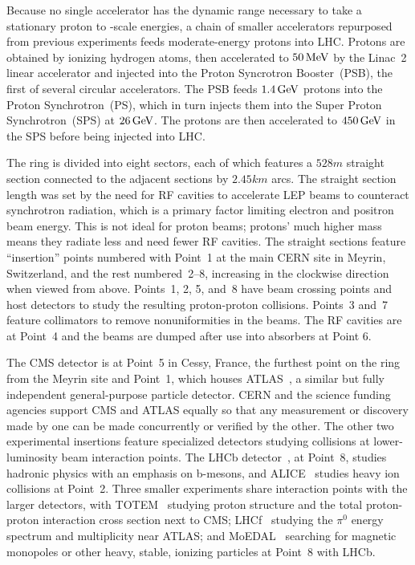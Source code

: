 Because no single accelerator has the dynamic range necessary to take a stationary proton to \TeV-scale energies, a chain of smaller accelerators repurposed from previous experiments feeds moderate-energy protons into LHC\@.
Protons are obtained by ionizing hydrogen atoms, then accelerated to $50\,\mathrm{Me\hspace{-.08em}V}$ by the Linac~2 linear accelerator and injected into the Proton Syncrotron Booster~(PSB), the first of several circular accelerators.
The PSB feeds $1.4\,\mathrm{Ge\hspace{-.08em}V}$ protons into the Proton Synchrotron~(PS), which in turn injects them into the Super Proton Synchrotron~(SPS) at $26\,\mathrm{Ge\hspace{-.08em}V}$.
The protons are then accelerated to $450\,\mathrm{Ge\hspace{-.08em}V}$ in the SPS before being injected into LHC\@.

The ring is divided into eight sectors, each of which features a $528\unit{m}$ straight section connected to the adjacent sections by $2.45\unit{km}$ arcs.
The straight section length was set by the need for RF cavities to accelerate LEP beams to counteract synchrotron radiation, which is a primary factor limiting electron and positron beam energy.
This is not ideal for proton beams; protons' much higher mass means they radiate less and need fewer RF cavities.
The straight sections feature ``insertion'' points numbered with Point~1 at the main CERN site in Meyrin, Switzerland, and the rest numbered~2--8, increasing in the clockwise direction when viewed from above.
Points~1, 2, 5, and~8 have beam crossing points and host detectors to study the resulting proton-proton collisions.
Points~3 and~7 feature collimators to remove nonuniformities in the beams.
The RF cavities are at Point~4 and the beams are dumped after use into absorbers at Point 6\@.

The CMS detector is at Point~5 in Cessy, France, the furthest point on the ring from the Meyrin site and Point~1, which houses ATLAS~\cite{Aad:2008zzm}, a similar but fully independent general-purpose particle detector.
CERN and the science funding agencies support CMS and ATLAS equally so that any measurement or discovery made by one can be made concurrently or verified by the other.
The other two experimental insertions feature specialized detectors studying collisions at lower-luminosity beam interaction points.
The LHCb detector~\cite{Alves:2008zz}, at Point~8, studies hadronic physics with an emphasis on b-mesons, and ALICE~\cite{Aamodt:2008zz} studies heavy ion collisions at Point~2\@.
Three smaller experiments share interaction points with the larger detectors, with TOTEM~\cite{Anelli:2008zza} studying proton structure and the total proton-proton interaction cross section next to CMS\@; LHCf~\cite{Adriani:2008zz} studying the $\pi^0$ energy spectrum and multiplicity near ATLAS\@; and MoEDAL~\cite{Acharya:2014nyr} searching for magnetic monopoles or other heavy, stable, ionizing particles at Point~8 with LHCb.



